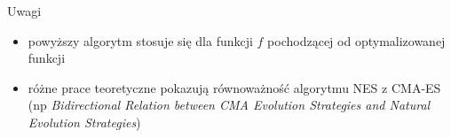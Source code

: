 \documentclass[unknownkeysallowed]{beamer}
\begin{document}
\begin{frame}{Uwagi}
  \begin{itemize}
  \item powyższy algorytm stosuje się dla funkcji $f$ pochodzącej od optymalizowanej funkcji \pause
  \item różne prace teoretyczne pokazują równoważność algorytmu NES z CMA-ES (np \textit{Bidirectional Relation between CMA Evolution Strategies and Natural Evolution Strategies}) 
  \end{itemize}

\end{frame}
\end{document}
